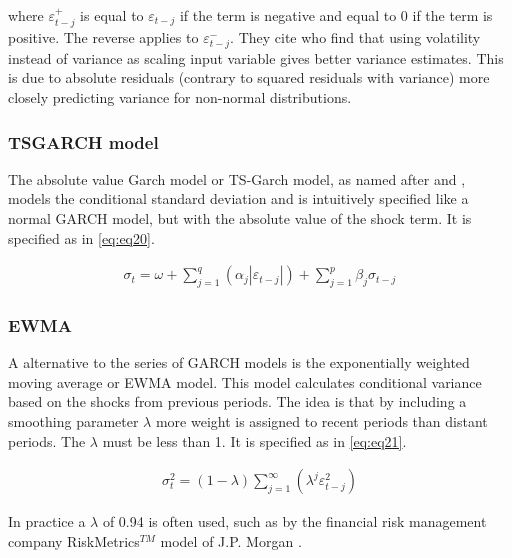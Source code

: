 \documentclass[a4paper, twoside]{templates/ociamthesis}
\begin{document}
\noindent where \(\varepsilon_{t-j}^+\) is equal to \(\varepsilon_{t-j}\) if the term is negative and equal to 0 if the term is positive. The reverse applies to \(\varepsilon_{t-j}^-\). They cite \textcite{davidian1987} who find that using volatility instead of variance as scaling input variable gives better variance estimates. This is due to absolute residuals (contrary to squared residuals with variance) more closely predicting variance for non-normal distributions.

\hypertarget{tsgarch-model}{%
\subsubsection{TSGARCH model}\label{tsgarch-model}}

\noindent The absolute value Garch model or TS-Garch model, as named after \textcite{taylor1986} and \textcite{schwert1989}, models the conditional standard deviation and is intuitively specified like a normal GARCH model, but with the absolute value of the shock term. It is specified as in \eqref{eq:eq20}.

\begin{align}
\sigma_t = \omega + \sum\limits_{j=1}^q (\alpha_j \left|\varepsilon_{t-j}\right|) +
\sum\limits_{j = 1}^p \beta_j \sigma_{t-j}
 \label{eq:eq20}
\end{align}

\newpage

\hypertarget{ewma}{%
\subsubsection{EWMA}\label{ewma}}

\noindent A alternative to the series of GARCH models is the exponentially weighted moving average or EWMA model. This model calculates conditional variance based on the shocks from previous periods. The idea is that by including a smoothing parameter \(\lambda\) more weight is assigned to recent periods than distant periods. The \(\lambda\) must be less than 1. It is specified as in \eqref{eq:eq21}.

\begin{align}
\sigma_t^2 = (1-\lambda) \sum\limits_{j=1}^\infty (\lambda^j \varepsilon_{t-j}^2)
 \label{eq:eq21}
\end{align}

In practice a \(\lambda\) of 0.94 is often used, such as by the financial risk management company RiskMetrics\(^{TM}\) model of J.P. Morgan \autocite{morganguarantytrustcompany1996}.
\end{document}
